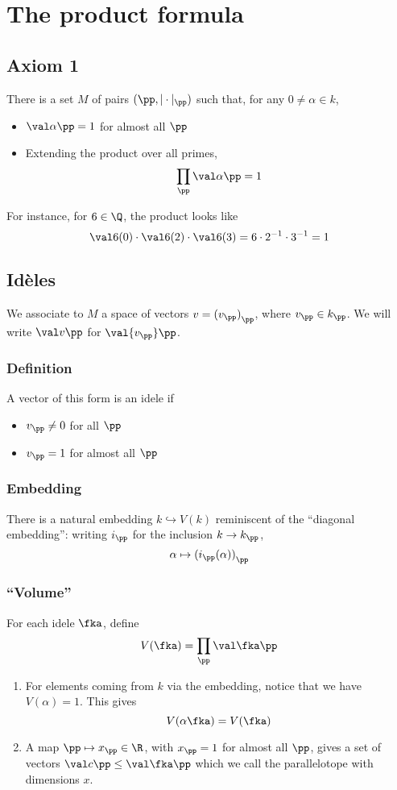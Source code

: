 \documentclass{article}
\begin{document}
\section{The product formula}
\label{sec:orgheadline26}
\subsection{Axiom 1}
\label{sec:orgheadline7}
There is a set \(M\) of pairs \((\pp, |\cdot|_\pp)\) such that, for any \(0\neq \alpha \in k\),
\begin{itemize}
\item \(\val\alpha\pp = 1\) for almost all \(\pp\)
\item Extending the product over all primes, 
\[ \prod_\pp \val\alpha\pp = 1 \]
\end{itemize}
For instance, for \(6\in\Q\), the product looks like
\[ \val6{(0)} \cdot\val6{(2)}\cdot\val6{(3)} = 6\cdot 2^{-1} \cdot 3^{-1} = 1 \]
\subsection{Idèles}
\label{sec:orgheadline19}
We associate to \(M\) a space of vectors \(v={ (v_\pp) }_\pp\), where \(v_\pp \in k_\pp\). We will write \(\val v\pp\) for \(\val{v_\pp}\pp\).
\subsubsection{Definition}
\label{sec:orgheadline8}
A vector of this form is an idele if 
\begin{itemize}
\item \(v_\pp\neq 0\) for all \(\pp\)
\item \(v_\pp = 1\) for almost all \(\pp\)
\end{itemize}
\subsubsection{Embedding}
\label{sec:orgheadline9}
There is a natural embedding \(k\hookrightarrow V(k)\) reminiscent of the ``diagonal embedding'': writing \(i_\pp\) for the inclusion \(k\to k_\pp\),
\[\alpha\mapsto{ (i_\pp(\alpha)) }_\pp\]
\subsubsection{``Volume''}
\label{sec:orgheadline12}
For each idele \(\fka\), define
\[V(\fka) = \prod_\pp \val\fka\pp \]
\begin{enumerate}
\item For elements coming from \(k\) via the embedding, notice that we have \(V(\alpha) = 1\). This gives
\label{sec:orgheadline10}
\[V(\alpha\fka) = V(\fka)\]
\item A map \(\pp\mapsto x_\pp \in\R\), with \(x_\pp = 1\) for almost all \(\pp\), gives a set of vectors \(\val c\pp \leq \val\fka\pp\) which we call the parallelotope with dimensions \(x\).
\label{sec:orgheadline11}
\end{enumerate}
\end{document}
